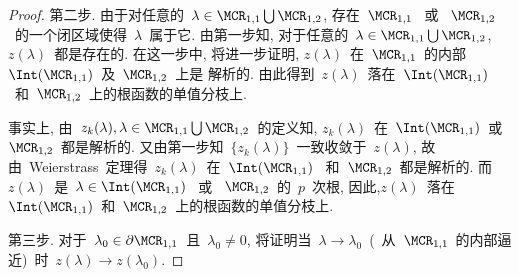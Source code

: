 \begin{proof}
第二步. 由于对任意的~$\lambda \in \MCR_{1,1} \bigcup \MCR_{1,2}$,
存在~$\MCR_{1,1}$~ 或
~$\MCR_{1,2}$~的一个闭区域使得~$\lambda$~属于它. 由第一步知,
对于任意的~$\lambda \in \MCR_{1,1}\bigcup \MCR_{1,2}$,
$z(\lambda)$~都是存在的. 在这一步中, 将进一步证明,
$z(\lambda)$~在~$\MCR_{1,1}$~的内部~$\Int(\MCR_{1,1})$~及~$\MCR_{1,2}$~上是
解析的.
由此得到~$z(\lambda)$~落在~$\Int(\MCR_{1,1})$~和~$\MCR_{1,2}$~上的根函数的单值分枝上.




事实上, 由~$z_k(\lambda), \lambda \in
\MCR_{1,1}\bigcup\MCR_{1,2}$~的定义知,
$z_k(\lambda)$~在~$\Int(\MCR_{1,1})$~或~$\MCR_{1,2}$~都是解析的.
又由第一步知~$\{z_k(\lambda)\}$~一致收敛于~$z(\lambda)$,
故由~Weierstrass~定理得~$z_k(\lambda)$~在~$\Int(\MCR_{1,1})$~
和~$\MCR_{1,2}$~都是解析的. 而~$z(\lambda)$~是~$\lambda \in
\Int(\MCR_{1,1})$~ 或 ~$\MCR_{1,2}$~的~$p$~次根,
因此,$z(\lambda)$~落在~$\Int(\MCR_{1,1})$~和~$\MCR_{1,2}$~上的根函数的单值分枝上.




第三步. 对于~$\lambda_0 \in \partial\MCR_{1,1}$~且~$\lambda_0 \neq
0$, 将证明当~$\lambda \to
\lambda_0$~(~从~$\MCR_{1,1}$~的内部逼近)~时~$z(\lambda) \to
z(\lambda_0)$.



\end{proof}
